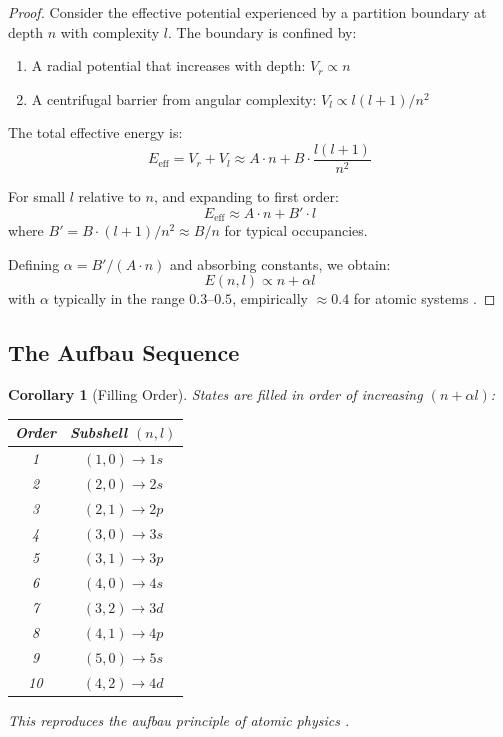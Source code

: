 \documentclass[twocolumn,10pt,a4paper]{article}
\newtheorem{corollary}[theorem]{Corollary}
\theoremstyle{definition}
\theoremstyle{remark}
\begin{document}
\begin{proof}
Consider the effective potential experienced by a partition boundary at depth $n$ with complexity $l$. The boundary is confined by:
\begin{enumerate}
    \item A radial potential that increases with depth: $V_r \propto n$
    \item A centrifugal barrier from angular complexity: $V_l \propto l(l+1)/n^2$
\end{enumerate}

The total effective energy is:
\begin{equation}
    E_{\text{eff}} = V_r + V_l \approx A \cdot n + B \cdot \frac{l(l+1)}{n^2}
\end{equation}

For small $l$ relative to $n$, and expanding to first order:
\begin{equation}
    E_{\text{eff}} \approx A \cdot n + B' \cdot l
\end{equation}
where $B' = B \cdot (l+1)/n^2 \approx B/n$ for typical occupancies.

Defining $\alpha = B'/(A \cdot n)$ and absorbing constants, we obtain:
\begin{equation}
    E(n, l) \propto n + \alpha l
\end{equation}
with $\alpha$ typically in the range $0.3$--$0.5$, empirically $\approx 0.4$ for atomic systems \cite{madelung1936}.
\end{proof}

\subsection{The Aufbau Sequence}

\begin{corollary}[Filling Order]
States are filled in order of increasing $(n + \alpha l)$:
\begin{center}
\begin{tabular}{cc}
\toprule
Order & Subshell $(n, l)$ \\
\midrule
1 & $(1, 0) \to 1s$ \\
2 & $(2, 0) \to 2s$ \\
3 & $(2, 1) \to 2p$ \\
4 & $(3, 0) \to 3s$ \\
5 & $(3, 1) \to 3p$ \\
6 & $(4, 0) \to 4s$ \\
7 & $(3, 2) \to 3d$ \\
8 & $(4, 1) \to 4p$ \\
9 & $(5, 0) \to 5s$ \\
10 & $(4, 2) \to 4d$ \\
\bottomrule
\end{tabular}
\end{center}
This reproduces the aufbau principle of atomic physics \cite{aufbau}.
\end{corollary}
\end{document}

